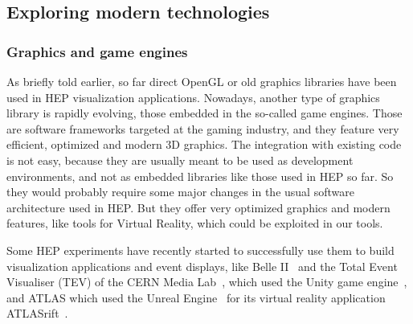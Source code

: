 \documentclass[12pt,a4paper]{article}
\begin{document}
\hypertarget{modern-tech}{%
\subsection{Exploring modern technologies}\label{modern-tech}}

\hypertarget{graphic-engines}{%
\subsubsection{Graphics and game engines}\label{graphic-engines}}

As briefly told earlier, so far direct OpenGL or old graphics libraries have been used in HEP visualization applications. Nowadays, another type of graphics library is rapidly evolving, those embedded in the so-called game engines. Those are software frameworks targeted at the gaming industry, and they feature very efficient, optimized and modern 3D graphics.
The integration with existing code is not easy, because they are usually meant to be used as development environments, and not as embedded libraries like those used in HEP so far. So they would probably require some major changes in the usual software architecture used in HEP. But they offer very optimized graphics and modern features, like tools for Virtual Reality, which could be exploited in our tools.

Some HEP experiments have recently started to successfully use them to build visualization applications and event displays, like Belle II~\cite{BelleIIVR} and the Total Event Visualiser (TEV) of the CERN Media Lab~\cite{CERNTEV}, which used the Unity game engine~\cite{Unity3D}, and ATLAS which used the Unreal Engine~\cite{EpicUnreal} for its virtual reality application ATLASrift~\cite{ATLASRift}.
\end{document}
